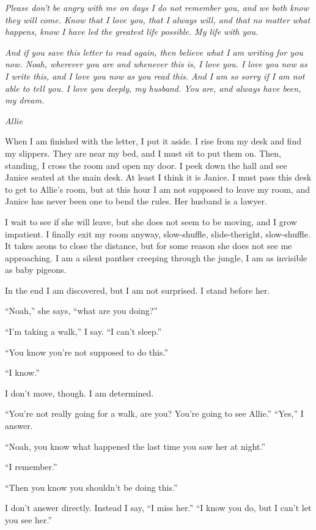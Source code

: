 \documentclass[10pt, twoside, openright]{book}
\begin{document}
\emph{Please don't be angry with me on days I do not remember you, and
we both know they will come. Know that I love you, that I always will,
and that no matter what happens, know I have led the greatest life
possible. My life with you.}

\emph{And if you save this letter to read again, then believe what I am
writing for you now. Noah, wherever you are and whenever this is, I love
you. I love you now as I write this, and I love you now as you read
this. And I am so sorry if I am not able to tell you. I love you deeply,
my husband. You are, and always have been, my dream.}

\emph{Allie}


When I am finished with the letter, I put it aside. I rise from my desk
and find my slippers. They are near my bed, and I must sit to put them
on. Then, standing, I cross the room and open my door. I peek down the
hall and see Janice seated at the main desk. At least I think it is
Janice. I must pass this desk to get to Allie's room, but at this hour I
am not supposed to leave my room, and Janice has never been one to bend
the rules. Her husband is a lawyer.

I wait to see if she will leave, but she does not seem to be moving, and
I grow impatient. I finally exit my room anyway, slow-shuffle,
slide-theright, slow-shuffle. It takes aeons to close the distance, but
for some reason she does not see me approaching. I am a silent panther
creeping through the jungle, I am as invisible as baby pigeons.


In the end I am discovered, but I am not surprised. I stand before her.

``Noah,'' she says, ``what are you doing?''

``I'm taking a walk,'' I say. ``I can't sleep.''

``You know you're not supposed to do this.''

``I know.''

I don't move, though. I am determined.

``You're not really going for a walk, are you? You're going to see
Allie.'' ``Yes,'' I answer.

``Noah, you know what happened the last time you saw her at night.''

``I remember.''

``Then you know you shouldn't be doing this.''


I don't answer directly. Instead I say, ``I miss her.'' ``I know you do,
but I can't let you see her.''
\end{document}
